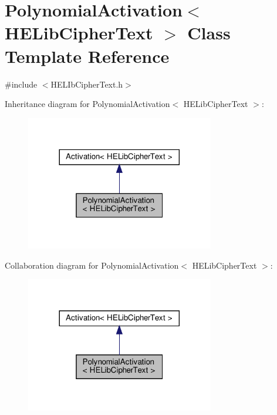 \hypertarget{classPolynomialActivation_3_01HELibCipherText_01_4}{}\section{Polynomial\+Activation$<$ H\+E\+Lib\+Cipher\+Text $>$ Class Template Reference}
\label{classPolynomialActivation_3_01HELibCipherText_01_4}


{\ttfamily \#include $<$H\+E\+L\+Ib\+Cipher\+Text.\+h$>$}



Inheritance diagram for Polynomial\+Activation$<$ H\+E\+Lib\+Cipher\+Text $>$\+:
\nopagebreak
\begin{figure}[H]
\begin{center}
\leavevmode
\includegraphics[width=233pt]{classPolynomialActivation_3_01HELibCipherText_01_4__inherit__graph}
\end{center}
\end{figure}


Collaboration diagram for Polynomial\+Activation$<$ H\+E\+Lib\+Cipher\+Text $>$\+:
\nopagebreak
\begin{figure}[H]
\begin{center}
\leavevmode
\includegraphics[width=233pt]{classPolynomialActivation_3_01HELibCipherText_01_4__coll__graph}
\end{center}
\end{figure}
